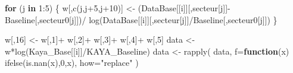 \documentclass[
]{article}
\newenvironment{Shaded}{\begin{snugshade}}{\end{snugshade}}
\newcommand{\AttributeTok}[1]{\textcolor[rgb]{0.77,0.63,0.00}{#1}}
\newcommand{\ControlFlowTok}[1]{\textcolor[rgb]{0.13,0.29,0.53}{\textbf{#1}}}
\newcommand{\DecValTok}[1]{\textcolor[rgb]{0.00,0.00,0.81}{#1}}
\newcommand{\FunctionTok}[1]{\textcolor[rgb]{0.00,0.00,0.00}{#1}}
\newcommand{\NormalTok}[1]{#1}
\newcommand{\OtherTok}[1]{\textcolor[rgb]{0.56,0.35,0.01}{#1}}
\newcommand{\SpecialCharTok}[1]{\textcolor[rgb]{0.00,0.00,0.00}{#1}}
\newcommand{\StringTok}[1]{\textcolor[rgb]{0.31,0.60,0.02}{#1}}
\begin{document}
\begin{Shaded}
\begin{Highlighting}[]
  \ControlFlowTok{for}\NormalTok{ (j }\ControlFlowTok{in} \DecValTok{1}\SpecialCharTok{:}\DecValTok{5}\NormalTok{) \{}
\NormalTok{    w[,}\FunctionTok{c}\NormalTok{(j,j}\SpecialCharTok{+}\DecValTok{5}\NormalTok{,j}\SpecialCharTok{+}\DecValTok{10}\NormalTok{)] }\OtherTok{\textless{}{-}}\NormalTok{ (DataBase[[i]][,secteur[j]]}\SpecialCharTok{{-}}\NormalTok{Baseline[,secteur0[j]])}\SpecialCharTok{/}
          \FunctionTok{log}\NormalTok{(DataBase[[i]][,secteur[j]]}\SpecialCharTok{/}\NormalTok{Baseline[,secteur0[j]])}
\NormalTok{  \}}
  
\NormalTok{  w[,}\DecValTok{16}\NormalTok{] }\OtherTok{\textless{}{-}}\NormalTok{ w[,}\DecValTok{1}\NormalTok{]}\SpecialCharTok{+}\NormalTok{ w[,}\DecValTok{2}\NormalTok{]}\SpecialCharTok{+}\NormalTok{ w[,}\DecValTok{3}\NormalTok{]}\SpecialCharTok{+}\NormalTok{ w[,}\DecValTok{4}\NormalTok{]}\SpecialCharTok{+}\NormalTok{ w[,}\DecValTok{5}\NormalTok{]}
\NormalTok{  data }\OtherTok{\textless{}{-}}\NormalTok{ w}\SpecialCharTok{*}\FunctionTok{log}\NormalTok{(Kaya\_Base[[i]]}\SpecialCharTok{/}\NormalTok{KAYA\_Baseline)}
\NormalTok{  data }\OtherTok{\textless{}{-}} \FunctionTok{rapply}\NormalTok{( data, }\AttributeTok{f=}\ControlFlowTok{function}\NormalTok{(x) }\FunctionTok{ifelse}\NormalTok{(}\FunctionTok{is.nan}\NormalTok{(x),}\DecValTok{0}\NormalTok{,x), }\AttributeTok{how=}\StringTok{"replace"}\NormalTok{ )}
  

\end{Highlighting}
\end{Shaded}
\end{document}
